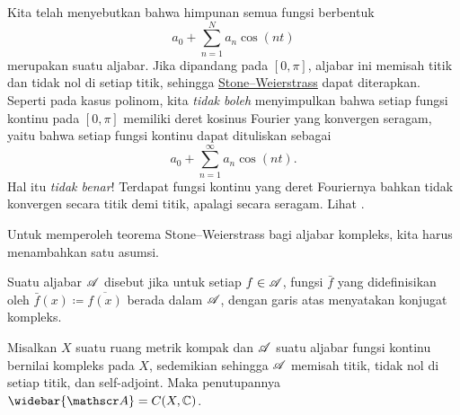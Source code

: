 \begin{example}
Kita telah menyebutkan bahwa himpunan semua fungsi berbentuk
\begin{equation*}
a_0 +
\sum_{n=1}^N a_n \cos(nt)
\end{equation*}
merupakan suatu aljabar.
Jika dipandang pada $[0,\pi]$,
aljabar ini memisah titik dan tidak nol di setiap titik, sehingga
\hyperref[thm:SWreal]{Stone--Weierstrass} dapat diterapkan.
Seperti pada kasus polinom, kita \emph{tidak boleh} menyimpulkan bahwa setiap fungsi
kontinu pada $[0,\pi]$ memiliki deret kosinus Fourier yang konvergen seragam,
yaitu bahwa setiap fungsi kontinu dapat dituliskan sebagai
\begin{equation*}
a_0 +
\sum_{n=1}^\infty a_n \cos(nt) .
\end{equation*}
Hal itu \emph{tidak benar}!
Terdapat fungsi kontinu yang deret Fouriernya bahkan tidak konvergen secara
titik demi titik, apalagi secara seragam. Lihat .
\end{example}

Untuk memperoleh teorema Stone--Weierstrass bagi aljabar kompleks, kita harus
menambahkan satu asumsi.

\begin{defn}
Suatu aljabar ${\mathscr{A}}$ disebut \emph{} jika untuk setiap $f \in {\mathscr{A}}$,
fungsi $\bar{f}$ yang didefinisikan oleh $\bar{f}(x) \coloneqq \overline{f(x)}$
berada dalam ${\mathscr{A}}$, dengan garis atas menyatakan konjugat kompleks.
\end{defn}

\begin{thm}
\label{thm:SWcomplex}%
%
Misalkan $X$ suatu ruang metrik kompak dan ${\mathscr{A}}$ suatu aljabar fungsi kontinu
bernilai kompleks pada $X$, sedemikian sehingga ${\mathscr{A}}$ memisah titik, tidak nol
di setiap titik, dan self-adjoint. Maka penutupannya
$\widebar{\sA} = C(X,\C)$.
\end{thm}

